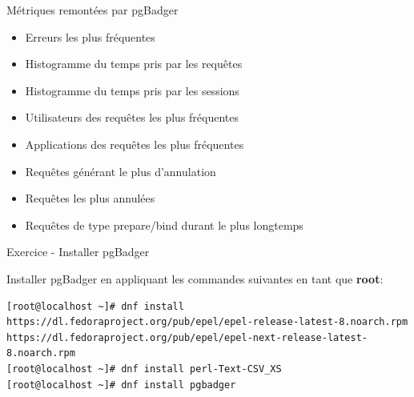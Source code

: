 
\begin{frame}{Métriques remontées par pgBadger}

   \begin{itemize}
      \item Erreurs les plus fréquentes
      \item Histogramme du temps pris par les requêtes
      \item Histogramme du temps pris par les sessions
      \item Utilisateurs des requêtes les plus fréquentes
      \item Applications des requêtes les plus fréquentes
      \item Requêtes générant le plus d'annulation
      \item Requêtes les plus annulées
      \item Requêtes de type prepare/bind durant le plus longtemps
   \end{itemize}

\end{frame}


\begin{frame}[fragile]{Exercice - Installer pgBadger}

   Installer pgBadger en appliquant les commandes suivantes en tant que \textbf{root}:


\begin{tiny}
\begin{Verbatim}[commandchars=\&\{\}]
[root@localhost ~]# dnf install https://dl.fedoraproject.org/pub/epel/epel-release-latest-8.noarch.rpm
https://dl.fedoraproject.org/pub/epel/epel-next-release-latest-8.noarch.rpm
[root@localhost ~]# dnf install perl-Text-CSV_XS
[root@localhost ~]# dnf install pgbadger
\end{Verbatim}
\end{tiny}

\end{frame}


